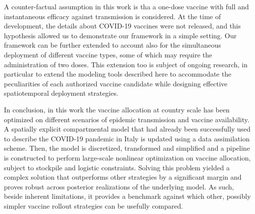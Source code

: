 A counter-factual assumption in this work is tha a one-dose vaccine with full and instantaneous efficacy against transmission is considered. At the time of development, the details about COVID-19 vaccines were not released, and this hypothesis allowed us to demonstrate our framework in a simple setting. Our framework can be further extended to account also for the simultaneous deployment of different vaccine types, some of which may require the administration of two doses. This extension too is subject of ongoing research, in particular to extend the modeling tools described here to accommodate the peculiarities of each authorized vaccine candidate while designing effective spatiotemporal deployment strategies.

In conclusion, in this work the vaccine allocation at country scale has been optimized on different scenarios of epidemic transmission and vaccine availability. A spatially explicit compartmental model that had already been successfully used to describe the COVID-19 pandemic in Italy is updated using a data assimilation scheme. Then, the model is  discretized, transformed and simplified and a pipeline is constructed to perform large-scale nonlinear optimization on vaccine allocation, subject to stockpile and logistic constraints. Solving this problem yielded a complex solution that outperforms other strategies by a significant margin and proves robust across posterior realizations of the underlying model. As such, beside inherent limitations, it provides a benchmark against which other, possibly simpler vaccine rollout strategies can be usefully compared.


